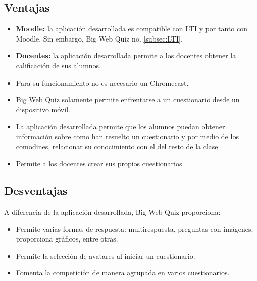 \subsection{Ventajas}

\begin{itemize}
	\item \textbf{Moodle:} la aplicación desarrollada es compatible con LTI y por tanto con Moodle. Sin embargo, Big Web Quiz no. \ref{subsec:LTI}.
	
	\item \textbf{Docentes:} la aplicación desarrollada permite a los docentes obtener la calificación de sus alumnos.
	
	\item Para su funcionamiento no es necesario un Chromecast.
	
	\item Big Web Quiz solamente permite enfrentarse a un cuestionario desde un dispositivo móvil.
	
	\item La aplicación desarrollada permite que los alumnos puedan obtener información sobre como han resuelto un cuestionario y por medio de los comodines, relacionar su conocimiento con el del resto de la clase.
	
	\item Permite a los docentes crear sus propios cuestionarios.
\end{itemize}

\subsection{Desventajas}

A diferencia de la aplicación desarrollada, Big Web Quiz proporciona:
	\begin{itemize}
	\item Permite varias formas de respuesta: multirespuesta, preguntas con imágenes, proporciona gráficos, entre otras.
	
	\item Permite la selección de avatares al iniciar un cuestionario.
	
	\item Fomenta la competición de manera agrupada en varios cuestionarios.
	
	\end{itemize}
	





